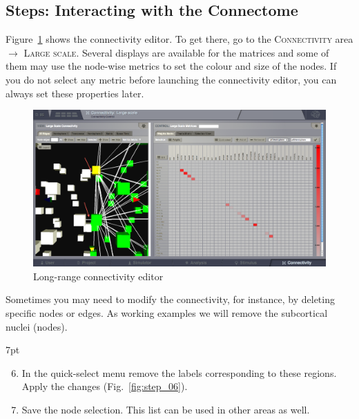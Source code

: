 \documentclass{tufte-handout}
\newenvironment{formal}{%
  \def\FrameCommand{%
    \hspace{1pt}%
    {\color{DarkBlue}\vrule width 2pt}%
    {\color{formalshade}\vrule width 4pt}%
    \colorbox{formalshade}%
  }%
  \MakeFramed{\advance\hsize-\width\FrameRestore}%
  \noindent\hspace{-4.55pt}%
  \begin{adjustwidth}{}{7pt}%
  \vspace{2pt}\vspace{2pt}%
}
{%
  \vspace{2pt}\end{adjustwidth}\endMakeFramed%
}
\begin{document}
\subsection{Steps: Interacting with the Connectome}

\noindent Figure~\ref{fig:fig} shows the connectivity editor. To get there, go to the
\textsc{Connectivity} area $\rightarrow$ \textsc{Large scale}. Several
displays are available for the matrices and some of them may use the node-wise
metrics to set the colour and size of the nodes. If you do not select any
metric before launching the connectivity editor, you can always set these
properties later.
\begin{figure}[h]
  \includegraphics[width=\linewidth]{steps_Connectivity_ShowConnections.png}%
  \caption{Long-range connectivity editor}%
  \label{fig:fig}%
\end{figure}

\noindent Sometimes you may need to modify the connectivity, for instance, by deleting
specific nodes or edges. As working examples we will remove the subcortical
nuclei (nodes).
\begin{formal}
  \begin{enumerate}
  \setcounter{enumi}{5}
  \item In the quick-select menu remove the labels corresponding to these regions. Apply the changes (Fig.~\ref{fig:step_06}). 
  \item Save the node selection. This list can be used in other areas as well.
  \end{enumerate}
\end{formal}
\end{document}
